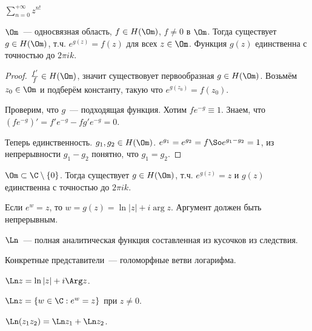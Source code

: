 \begin{example}
    $\sum\limits_{n=0}^{+\infty} z^{n!}$
\end{example}

\begin{theorem}
    $\Om$~--- односвязная область, $f \in H(\Om)$,
    $f \ne 0$ в $\Om$. Тогда существует $g \in H(\Om)$,
    т.ч. $e^{g(z)} = f(z)$ для всех $z \in \Om$.
    Функция $g(z)$ единственна с точностью до $2\pi ik$.
\end{theorem}

\begin{proof}
    $\frac{f'}{f} \in H(\Om)$, значит существовует первообразная
    $g \in H(\Om)$.
    Возьмём $z_0 \in \Om$ и подберём константу,
    такую что $e^{g(z_0)} = f(z_0)$.

    Проверим, что $g$~--- подходящая функция.
    Хотим $fe^{-g} \equiv 1$.
    Знаем, что $(fe^{-g})' = f'e^{-g} - fg'e^{-g} = 0$.

    Теперь единственность. $g_1, g_2 \in H(\Om)$.
    $e^{g_1} = e^{g_2} = f \So e^{g_1 - g_2} = 1$,
    из непрерывности $g_1 - g_2$ понятно, что $g_1 = g_2$.
\end{proof}

\begin{consequence}
    $\Om \subset \C \setminus \{0\}$.
    Тогда существует $g \in H(\Om)$, т.ч. $e^{g(z)} = z$
    и $g(z)$ единственна с точностью до $2\pi i k$.
\end{consequence}

\begin{observation}
    Если $e^w = z$, то $w = g(z) = \ln |z| + i \arg z$.
    Аргумент должен быть непрерывным.
\end{observation}

\begin{definition}
    $\Ln$~--- полная аналитическая функция
    составленная из кусочков из следствия.

    Конкретные представители~--- голоморфные ветви логарифма.
\end{definition}

\begin{property}
    $\Ln z = \ln |z| + i\Arg z$.
\end{property}

\begin{property}
    $\Ln z = \left\{w \in \C : e^w = z\right\}$
    при $z \ne 0$.
\end{property}

\begin{property}
    $\Ln(z_1z_2) = \Ln z_1 + \Ln z_2$.
\end{property}

